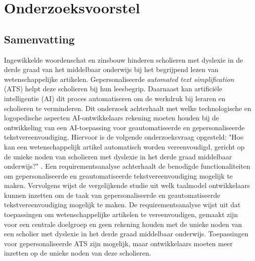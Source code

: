 \documentclass[dutch,dit,thesis]{hogentreport}
\begin{document}










\appendix

\chapter{Onderzoeksvoorstel}

\section*{Samenvatting}

Ingewikkelde woordenschat en zinsbouw hinderen scholieren met dyslexie in de derde graad van het middelbaar onderwijs bij het begrijpend lezen van wetenschappelijke artikelen. Gepersonaliseerde \textit{automated text simplification} (ATS) helpt deze scholieren bij hun leesbegrip. Daarnaast kan artificiële intelligentie (AI) dit proces automatiseren om de werkdruk bij leraren en scholieren te verminderen. Dit onderzoek achterhaalt met welke technologische en logopedische aspecten AI-ontwikkelaars rekening moeten houden bij de ontwikkeling van een AI-toepassing voor geautomatiseerde en gepersonaliseerde tekstvereenvoudiging. Hiervoor is de volgende onderzoeksvraag opgesteld: "Hoe kan een wetenschappelijk artikel automatisch worden vereenvoudigd, gericht op de unieke noden van scholieren met dyslexie in het derde graad middelbaar onderwijs?" . Een requirementsanalyse achterhaalt de benodigde functionaliteiten om gepersonaliseerde en geautomatiseerde tekstvereenvoudiging mogelijk te maken. Vervolgens wijst de vergelijkende studie uit welk taalmodel ontwikkelaars kunnen inzetten om de taak van gepersonaliseerde en geautomatiseerde tekstvereenvoudiging mogelijk te maken. De requirementsanalyse wijst uit dat toepassingen om wetenschappelijke artikelen te vereenvoudigen, gemaakt zijn voor een centrale doelgroep en geen rekening houden met de unieke noden van een scholier met dyslexie in het derde graad middelbaar onderwijs. Toepassingen voor gepersonaliseerde ATS zijn mogelijk, maar ontwikkelaars moeten meer inzetten op de unieke noden van deze scholieren.







\backmatter{}

\setlength\bibitemsep{2pt} %
\printbibliography[heading=bibintoc]
\end{document}
